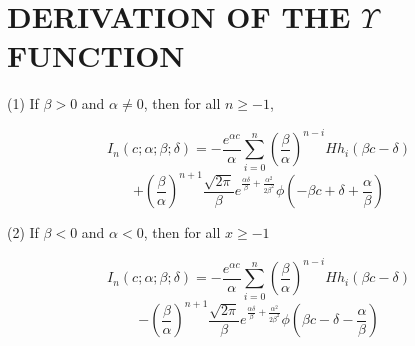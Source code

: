 \chapter{DERIVATION OF THE $\Upsilon$ FUNCTION}%
\label{appendixC}







\label{first}

(1) If $\beta>0$ and $\alpha\neq0$, then for all $n\geq-1$,

$$I_{n}(c;\alpha; \beta; \delta) = - \frac{e^{\alpha c}}{\alpha} \sum_{i=0}^{n}(\frac{\beta}{\alpha})^{n-i} Hh_{i}(\beta c -\delta)$$
$$+ (\frac{\beta}{\alpha})^{n+1} \frac{\sqrt{2 \pi}}{\beta} e^{\frac{\alpha \delta}{\beta}+\frac{\alpha^{2}}{2\beta^{2}}} \phi(-\beta c + \delta + \frac{\alpha}{\beta})$$

(2) If $\beta<0$ and $\alpha<0$, then for all $x \geq -1$

$$I_{n}(c;\alpha; \beta; \delta) = - \frac{e^{\alpha c}}{\alpha} \sum_{i=0}^{n}(\frac{\beta}{\alpha})^{n-i} Hh_{i}(\beta c -\delta)$$
$$- (\frac{\beta}{\alpha})^{n+1} \frac{\sqrt{2 \pi}}{\beta} e^{\frac{\alpha \delta}{\beta}+\frac{\alpha^{2}}{2\beta^{2}}} \phi(\beta c - \delta - \frac{\alpha}{\beta})$$

